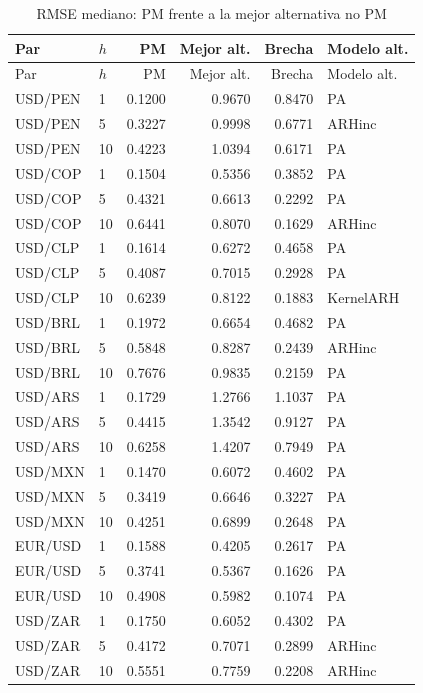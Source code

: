 \documentclass[12pt,a4paper]{article}
\begin{document}
\begin{longtable}{llrrrl}
\caption{RMSE mediano: PM frente a la mejor alternativa no PM}
\label{tab:rmse_best}\\
\toprule
Par & \(h\) & PM & Mejor alt. & Brecha & Modelo alt. \\
\midrule
\endfirsthead
\toprule
Par & \(h\) & PM & Mejor alt. & Brecha & Modelo alt. \\
\midrule
\endhead
USD/PEN & 1 & 0.1200 & 0.9670 & 0.8470 & PA \\
USD/PEN & 5 & 0.3227 & 0.9998 & 0.6771 & ARHinc \\
USD/PEN & 10 & 0.4223 & 1.0394 & 0.6171 & PA \\
USD/COP & 1 & 0.1504 & 0.5356 & 0.3852 & PA \\
USD/COP & 5 & 0.4321 & 0.6613 & 0.2292 & PA \\
USD/COP & 10 & 0.6441 & 0.8070 & 0.1629 & ARHinc \\
USD/CLP & 1 & 0.1614 & 0.6272 & 0.4658 & PA \\
USD/CLP & 5 & 0.4087 & 0.7015 & 0.2928 & PA \\
USD/CLP & 10 & 0.6239 & 0.8122 & 0.1883 & KernelARH \\
USD/BRL & 1 & 0.1972 & 0.6654 & 0.4682 & PA \\
USD/BRL & 5 & 0.5848 & 0.8287 & 0.2439 & ARHinc \\
USD/BRL & 10 & 0.7676 & 0.9835 & 0.2159 & PA \\
USD/ARS & 1 & 0.1729 & 1.2766 & 1.1037 & PA \\
USD/ARS & 5 & 0.4415 & 1.3542 & 0.9127 & PA \\
USD/ARS & 10 & 0.6258 & 1.4207 & 0.7949 & PA \\
USD/MXN & 1 & 0.1470 & 0.6072 & 0.4602 & PA \\
USD/MXN & 5 & 0.3419 & 0.6646 & 0.3227 & PA \\
USD/MXN & 10 & 0.4251 & 0.6899 & 0.2648 & PA \\
EUR/USD & 1 & 0.1588 & 0.4205 & 0.2617 & PA \\
EUR/USD & 5 & 0.3741 & 0.5367 & 0.1626 & PA \\
EUR/USD & 10 & 0.4908 & 0.5982 & 0.1074 & PA \\
USD/ZAR & 1 & 0.1750 & 0.6052 & 0.4302 & PA \\
USD/ZAR & 5 & 0.4172 & 0.7071 & 0.2899 & ARHinc \\
USD/ZAR & 10 & 0.5551 & 0.7759 & 0.2208 & ARHinc \\
\bottomrule
\end{longtable}
\end{document}
